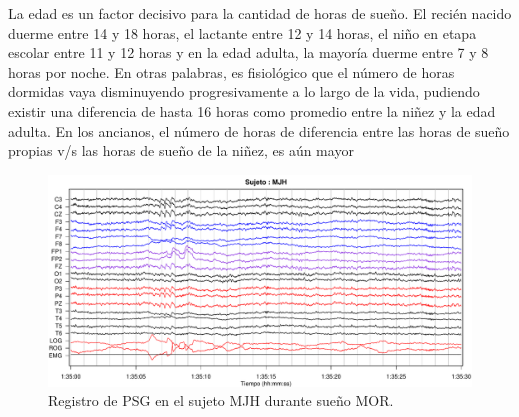 La edad es un factor decisivo para la cantidad de horas de sueño. El recién nacido duerme entre 14 y 18 horas, el lactante entre 12 y 14 horas, el niño en etapa escolar entre 11 y 12 horas y en la edad adulta, la mayoría duerme entre 7 y 8 horas por noche. En otras palabras, es fisiológico que el número de horas dormidas vaya disminuyendo progresivamente a lo largo de la vida, pudiendo existir una diferencia de hasta 16 horas como promedio entre la niñez y la edad adulta. En los ancianos, el número de horas de diferencia entre las horas de sueño propias v/s las horas de sueño de la niñez, es aún mayor \cite{Contreras13}

\begin{figure}
\centering
\includegraphics[width=\linewidth]
{./img_ejemplos/MJH_190_PDG_lucirse_PSG.pdf}
\caption{Registro de PSG en el sujeto MJH durante sue\~no MOR. 
}
\label{ejemplos_mor}
\end{figure}

%

